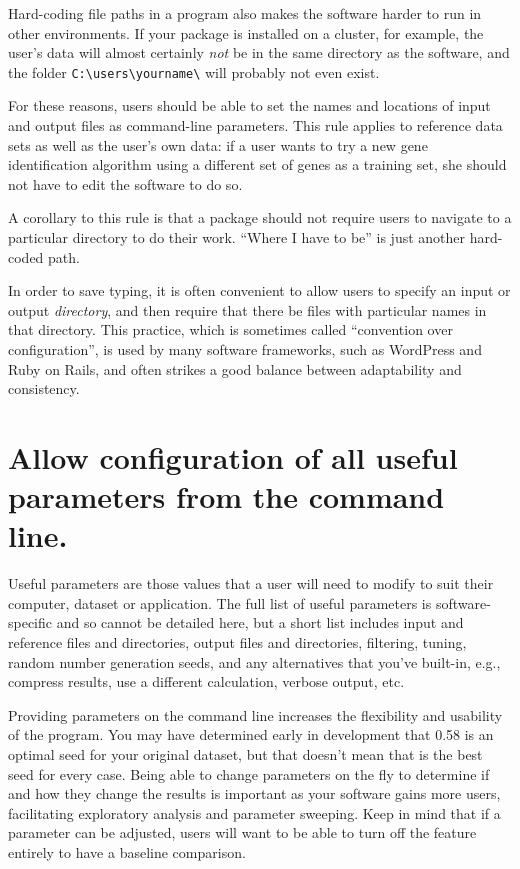 \documentclass[10pt]{article}
\begin{document}
Hard-coding file paths in a program also makes the software harder to run
in other environments. If your package is installed on a cluster, for
example, the user's data will almost certainly \emph{not} be in the same
directory as the software, and the folder
\texttt{C:\textbackslash{}users\textbackslash{}yourname\textbackslash{}}
will probably not even exist.

For these reasons, users should be able to set the names and locations
of input and output files as command-line parameters. This rule applies
to reference data sets as well as the user's own data: if a user wants
to try a new gene identification algorithm using a different set of
genes as a training set, she should not have to edit the software to do
so.

A corollary to this rule is that a package should not require users to
navigate to a particular directory to do their work. ``Where I have to
be'' is just another hard-coded path.

In order to save typing, it is often convenient to allow users to
specify an input or output \emph{directory}, and then require that there
be files with particular names in that directory. This practice, which
is sometimes called ``convention over configuration'', is used by many
software frameworks, such as WordPress and Ruby on Rails, and often
strikes a good balance between adaptability and consistency.

\section{Allow configuration of all useful parameters from the command line.}

Useful parameters are those values that a user will need to modify to suit
their computer, dataset or application. 
The full list of useful parameters is software-specific and so cannot be
detailed here, but a short list includes
input and reference files and directories,
output files and directories,
filtering,
tuning,
random number generation seeds,
and
any alternatives that you've built-in,
e.g.,
compress results, use a different calculation, verbose output, etc.

Providing parameters on the
command line increases the flexibility and usability of the program. You
may have determined early in development that 0.58 is an optimal seed for your
original dataset, but that doesn't mean that is the best seed for every
case. Being able to change parameters on the fly to determine if and how
they change the results is important as your software gains more users,
facilitating exploratory analysis and parameter sweeping. Keep in mind
that if a parameter can be adjusted, users will want to be able to turn
off the feature entirely to have a baseline comparison.
\end{document}
